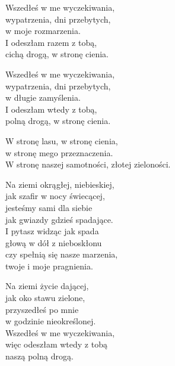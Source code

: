 \begin{text}
    Wszedłeś w me wyczekiwania,\\
    wypatrzenia, dni przebytych,\\
    w moje rozmarzenia.\\
    I odeszłam razem z tobą,\\
    cichą drogą, w stronę cienia.

    Wszedłeś w me wyczekiwania,\\
    wypatrzenia, dni przebytych,\\
    w długie zamyślenia.\\
    I odeszłam wtedy z tobą,\\
    polną drogą, w stronę cienia.

    W stronę lasu, w stronę cienia,\\
    w stronę mego przeznaczenia.\\
    W stronę naszej samotności, złotej zieloności.

    Na ziemi okrągłej, niebieskiej,\\
    jak szafir w nocy świecącej,\\
    jesteśmy sami dla siebie\\
    jak gwiazdy gdzieś spadające.\\
    I pytasz widząc jak spada\\
    głową w dół z nieboskłonu\\
    czy spełnią się nasze marzenia,\\
    twoje i moje pragnienia.

    Na ziemi życie dającej,\\
    jak oko stawu zielone,\\
    przyszedłeś po mnie\\
    w godzinie nieokreślonej.\\
    Wszedłeś w me wyczekiwania,\\
    więc odeszłam wtedy z tobą\\
    naszą polną drogą.
\end{text}
\begin{chord}

\end{chord}